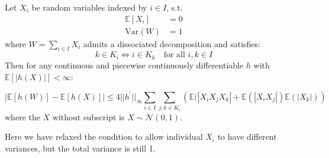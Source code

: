 \documentclass{article}
\begin{document}
\begin{theorem}\label{thm:stein_equation_normal_dependent}
     Let $X_i$ be random variables indexed by $i\in I$, s.t. 
     \begin{align*}
        \mathbb{E}[X_i]&=0\\
        \mathrm{Var}(W) &= 1 
     \end{align*}
     where $W = \sum_{i\in I} X_i$ admits a dissociated decomposition and satisfies:
     \begin{equation}\label{eq:equivalence_class_of_decomposition}
        k \in K_i \iff i \in K_k \quad \text{for all $i,k\in I$}     
     \end{equation}
     Then for any continuous and piecewise continuously differentiable $h$ with $\mathbb{E}[|h(X)|]<\infty$:

    \begin{equation*}
        \left|\mathbb{E}[h(W)] - \mathbb{E}[h(X)]\right| \leq 4||h^{\prime}||_\infty \sum_{i\in I}\sum_{j,k\in K_{i}}\left(\mathbb{E}(|X_{i}X_{j}X_{k}|+\mathbb{E}(|X_{i}X_{j}|)\mathbb{E}(|X_{k}|)\right)
    \end{equation*}
    where the $X$ without subscript is $X \sim \mathcal{N}(0,1)$.  
\end{theorem}

\begin{remark}
    Here we have relaxed the condition to allow individual $X_i$ to have different variances, but the total variance is still 1.
\end{remark}
\end{document}
